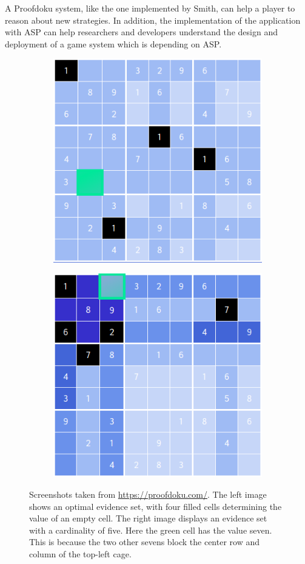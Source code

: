 \documentclass[runningheads]{llncs}
\newcommand{\authorquote}{Smith}
\begin{document}
A Proofdoku system, like the one implemented by \authorquote{}, can help a player to reason about new strategies. In addition, the implementation of the application with ASP can help researchers and developers understand the design and deployment of a game system which is depending on ASP. 


\begin{figure}
\begin{subfigure}{0.5\textwidth}
  \centering
  \includegraphics[width=.8\linewidth]{Answer_Set_Programming_in_Proofdoku/4_evidence_set.png}
\end{subfigure}%
\begin{subfigure}{0.5\textwidth}
  \centering
  \includegraphics[width=.8\linewidth]{Answer_Set_Programming_in_Proofdoku/5_evidence_set.png}
\end{subfigure}
\caption{Screenshots taken from \url{https://proofdoku.com/}. The left image shows an optimal evidence set, with four filled cells determining the value of an empty cell. The right image displays an evidence set with a cardinality of five. Here the green cell has the value seven. This is because the two other sevens block the center row and column of the top-left cage.}
\label{fig:proofdoku}
\end{figure}
\end{document}
